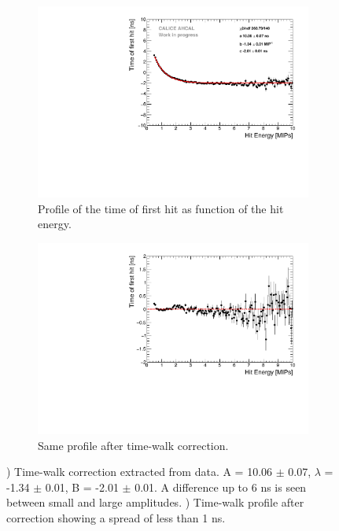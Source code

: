 \begin{figure}[htbp!]
	\begin{subfigure}[t]{0.45\textwidth}
		\centering
		\includegraphics[width=1\textwidth]{chap5/fig_AHCAL_timing/Muons/TimeWalkProfile.pdf}
		\caption{Profile of the time of first hit as function of the hit energy.}\label{fig:time_walk}
	\end{subfigure}
	\hfill
	\begin{subfigure}[t]{0.45\textwidth}
		\centering
		\includegraphics[width=1\textwidth]{chap5/fig_AHCAL_timing/Muons/TimeWalkProfile_Correction.pdf}
		\caption{Same profile after time-walk correction.}\label{fig:time_walk_corr}
	\end{subfigure}
	\caption{) Time-walk correction extracted from data. A = 10.06 $\pm$ 0.07, $\lambda$ = -1.34 $\pm$ 0.01, B = -2.01 $\pm$ 0.01. A difference up to 6 ns is seen between small and large amplitudes. ) Time-walk profile after correction showing a spread of less than 1 ns.}
\end{figure}

